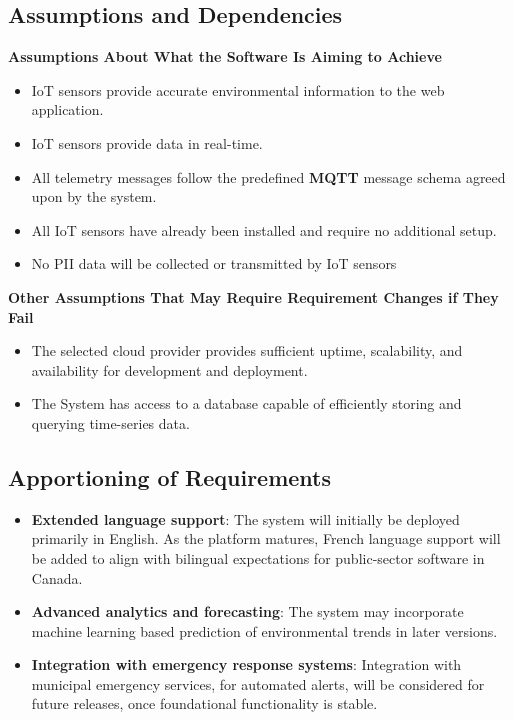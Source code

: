 \documentclass[]{article}
\begin{document}
\subsection{Assumptions and Dependencies}
\label{sub:assumptions_and_dependencies}
\textbf{Assumptions About What the Software Is Aiming to Achieve}
    \begin{itemize}
        \item IoT sensors provide accurate environmental information to the web application.
        \item IoT sensors provide data in real-time.
        \item All telemetry messages follow the predefined \textbf{MQTT} message schema agreed upon by the system.
        \item All IoT sensors have already been installed and require no additional setup.
        \item No PII data will be collected or transmitted by IoT sensors
    \end{itemize}

    \noindent\textbf{Other Assumptions That May Require Requirement Changes if They Fail}
    \begin{itemize}
        \item The selected cloud provider provides sufficient uptime, scalability, and availability for development and deployment.
        \item The System has access to a database capable of efficiently storing and querying time-series data. 
    \end{itemize}



\subsection{Apportioning of Requirements}
\label{sub:apportioning_of_requirements}
\begin{itemize}
    \item \textbf{Extended language support}: The system will initially be deployed primarily in English. As the platform matures, French language support will be added to align with bilingual expectations for public-sector software in Canada.
    
    \item \textbf{Advanced analytics and forecasting}: The system may incorporate machine learning based prediction of environmental trends in later versions.

    \item \textbf{Integration with emergency response systems}: Integration with municipal emergency services, for automated alerts, will be considered for future releases, once foundational functionality is stable.
\end{itemize}
\end{document}

